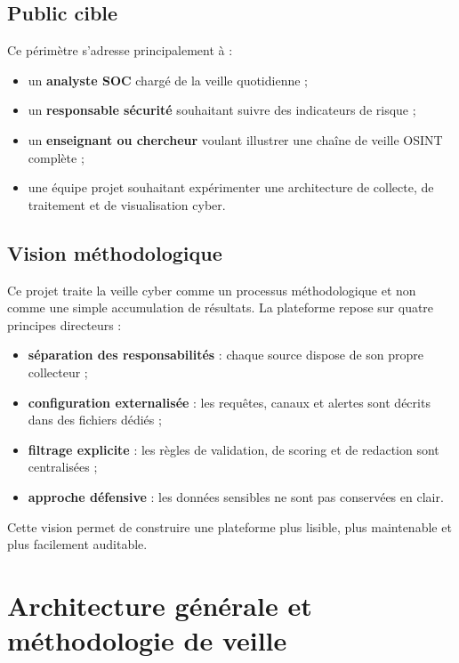 \documentclass[12pt,a4paper]{report}
\begin{document}
\section{Public cible}

Ce périmètre s'adresse principalement à :

\begin{itemize}
  \item un \textbf{analyste SOC} chargé de la veille quotidienne ;
  \item un \textbf{responsable sécurité} souhaitant suivre des indicateurs de risque ;
  \item un \textbf{enseignant ou chercheur} voulant illustrer une chaîne de veille OSINT complète ;
  \item une équipe projet souhaitant expérimenter une architecture de collecte, de traitement et de visualisation cyber.
\end{itemize}

\section{Vision méthodologique}

Ce projet traite la veille cyber comme un processus méthodologique et non comme une simple accumulation de résultats. La plateforme repose sur quatre principes directeurs :

\begin{itemize}
  \item \textbf{séparation des responsabilités} : chaque source dispose de son propre collecteur ;
  \item \textbf{configuration externalisée} : les requêtes, canaux et alertes sont décrits dans des fichiers dédiés ;
  \item \textbf{filtrage explicite} : les règles de validation, de scoring et de redaction sont centralisées ;
  \item \textbf{approche défensive} : les données sensibles ne sont pas conservées en clair.
\end{itemize}

Cette vision permet de construire une plateforme plus lisible, plus maintenable et plus facilement auditable.

\chapter{Architecture générale et méthodologie de veille}
\end{document}
